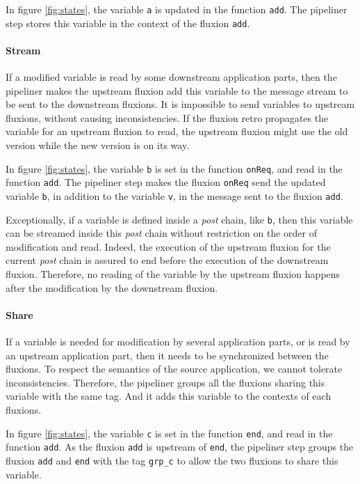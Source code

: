 In figure \ref{fig:states}, the variable \texttt{a} is updated in the function \texttt{add}.
The pipeliner step stores this variable in the context of the fluxion \texttt{add}.

\paragraph{Stream}
If a modified variable is read by some downstream application parts, then the pipeliner makes the upstream fluxion add this variable to the message stream to be sent to the downstream fluxions.
It is impossible to send variables to upstream flux\-ions, without causing inconsistencies.
If the fluxion retro propagates the variable for an upstream fluxion to read, the upstream fluxion might use the old version while the new version is on its way.

In figure \ref{fig:states}, the variable \texttt{b} is set in the function \texttt{onReq}, and read in the function \texttt{add}.
The pipeliner step makes the fluxion \texttt{onReq} send the updated variable \texttt{b}, in addition to the variable \texttt{v}, in the message sent to the fluxion \texttt{add}.

Exceptionally, if a variable is defined inside a \textit{post} chain, like \texttt{b}, then this variable can be streamed inside this \textit{post} chain without restriction on the order of modification and read.
Indeed, the execution of the upstream fluxion for the current \textit{post} chain is assured to end before the execution of the downstream fluxion.
Therefore, no reading of the variable by the upstream fluxion happens after the modification by the downstream fluxion.

\paragraph{Share}
If a variable is needed for modification by several application parts, or is read by an upstream application part, then it needs to be synchronized between the fluxions.
To respect the semantics of the source application, we cannot tolerate inconsistencies.
Therefore, the pipeliner groups all the fluxions sharing this variable with the same tag.
And it adds this variable to the contexts of each fluxions.

In figure \ref{fig:states}, the variable \texttt{c} is set in the function \texttt{end}, and read in the function \texttt{add}.
As the fluxion \texttt{add} is upstream of \texttt{end}, the pipeliner step groups the fluxion \texttt{add} and \texttt{end} with the tag \texttt{grp\_c} to allow the two fluxions to share this variable.